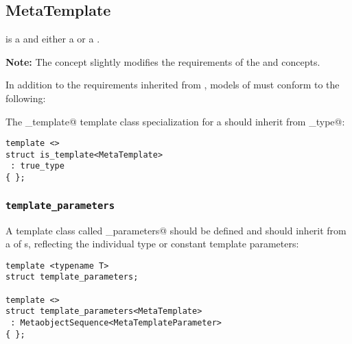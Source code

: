 \subsection{MetaTemplate}
\label{concept-MetaTemplate}



 is a  and either a  or a .

\textbf{Note:} The  concept slightly modifies the requirements
of the  and  concepts.

In addition to the requirements inherited from ,
models of  must conform to the following:

The \verb@is_template@ template class specialization for a  should
inherit from \verb@true_type@:

\begin{verbatim}
template <>
struct is_template<MetaTemplate>
 : true_type
{ };
\end{verbatim}

\subsubsection{\texttt{template\_parameters}}

A template class called \verb@template_parameters@ should be defined and should
inherit from a  of s,
reflecting the individual type or constant template parameters:

\begin{verbatim}
template <typename T>
struct template_parameters;

template <>
struct template_parameters<MetaTemplate>
 : MetaobjectSequence<MetaTemplateParameter>
{ };
\end{verbatim}

